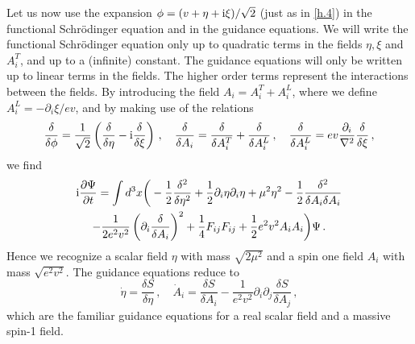 \documentclass[12pt]{article}
\def\pa{\partial}
\def\ii{\textrm i}
\begin{document}
Let us now use the expansion $\phi=( v + \eta + \ii \xi)/\sqrt{2}$ (just as in \eqref{h.4}) in the functional Schr{\"o}\-ding\-er equation and in the guidance equations. We will write the functional Schr{\"o}\-ding\-er equation only up to quadratic terms in the fields $\eta,\xi$ and ${ A}^T_i$, and up to a (infinite) constant. The guidance equations will only be written up to linear terms in the fields. The higher order terms represent the interactions between the fields. By introducing the field ${ A}_i={ A}^T_i +{ A}^L_i $, where we define ${ A}^L_i = -\partial_i \xi/ ev$, and by making use of the relations
\begin{equation}
\frac{\delta }{\delta { \phi} } = \frac{1}{\sqrt{2}}\left( \frac{\delta }{\delta { \eta} } -\ii \frac{\delta }{\delta { \xi} } \right) \,,  \quad \frac{\delta }{\delta { A_i} } = \frac{\delta }{\delta { A^T_i} } + \frac{\delta }{\delta { A^L_i} }\,, \quad   \frac{\delta }{\delta { A^L_i} } = ev \frac{\pa_i}{\nabla^2} \frac{\delta }{\delta { \xi} }  \,,  
\label{h.10}
\end{equation}
we find
\begin{multline}
\ii\frac{\partial \Psi}{\partial t} = \int d^3 x  \bigg( - \frac{1}{2} \frac{\delta^2 }{\delta \eta^2 } +  \frac{1}{2} \partial_i {\eta} \partial_i { \eta}  +  \mu^2{ \eta}^2   - \frac{1}{2} \frac{\delta^2}{\delta  A_{i}\delta  A_{i}}  \\
-\frac{1}{2e^2v^2} \left( \partial_i  \frac{\delta}{\delta  A_{i} } \right)^2  + \frac{1}{4}F_{ij}F_{ij} + \frac{1}{2}e^2v^2  A_i A_i  \bigg)\Psi\,.
\label{h.11}
\end{multline}
Hence we recognize a scalar field $\eta$ with mass ${\sqrt{2\mu^2}}$ and a spin one field $A_i$ with mass ${\sqrt{e^2v^2}}$. The guidance equations reduce to 
\begin{equation}
{\dot \eta} =   \frac{\delta S}{\delta \eta }   \,, \quad {\dot A}_{i}  = \frac{\delta S}{\delta A_i } - \frac{1}{e^2v^2} \partial_i\partial_j \frac{\delta S}{\delta A_j } \,,
\label{h.12}
\end{equation}
which are the familiar guidance equations for a real scalar field and a massive spin-1 field.




\end{document}
